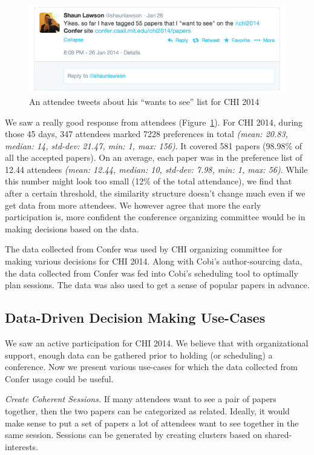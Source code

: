 \documentclass{sigchi}
\begin{document}
\begin{figure}[!h]
\centering
\includegraphics[width=0.95\columnwidth]{attendees-response.png}
\caption{An attendee tweets about his ``wants to see'' list for CHI 2014}
\label{attendee-response}
\end{figure}

We saw a really good response from attendees (Figure~\ref{attendee-response}). For CHI 2014, during those 45 days, 347 attendees marked 7228 preferences in total \emph{(mean: 20.83, median: 14, std-dev: 21.47, min: 1, max: 156)}. It covered 581 papers (98.98\% of all the accepted papers). On an average, each paper was in the preference list of 12.44 attendees \emph{(mean: 12.44, median: 10, std-dev: 7.98, min: 1, max: 56)}. While this number might look too small (12\% of the total attendance), we find that after a certain threshold, the similarity structure doesn't change much even if we get data from more attendees. We however agree that more the early participation is, more confident the conference organizing committee would be in making decisions based on the data.

The data collected from Confer was used by CHI organizing committee for making various decisions for CHI 2014. Along with Cobi's author-sourcing data, the data collected from Confer was fed into Cobi's scheduling tool to optimally plan sessions. The data was also used to get a sense of popular papers in advance.

\subsection {Data-Driven Decision Making Use-Cases}
We saw an active participation for CHI 2014. We believe that with organizational support, enough data can be gathered prior to holding (or scheduling) a conference. Now we present various use-cases for which the data collected from Confer usage could be useful. 

\emph{Create Coherent Sessions.} If many attendees want to see a pair of papers together, then the two papers can be categorized as related. Ideally, it would make sense to put a set of papers a lot of attendees want to see together in the same session. Sessions can be generated by creating clusters based on shared-interests.
\end{document}
